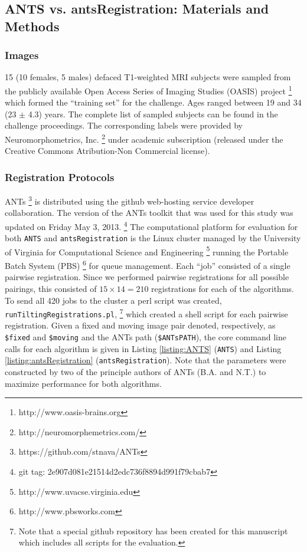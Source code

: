 \documentclass[final,5p,times,twocolumn]{elsarticle}
\begin{document}
\subsection{ANTS vs. antsRegistration:  Materials and Methods}

\subsubsection{Images}
15 (10 females, 5 males) defaced T1-weighted MRI subjects 
were sampled from the 
publicly available 
Open Access Series of Imaging Studies (OASIS) 
project%
\footnote{
  http://www.oasis-brains.org
} 
which formed the ``training set'' for the challenge.  
Ages ranged between 19 and 34 (23 $\pm$ 4.3) years.
The complete
list of sampled subjects can be found in the challenge proceedings.
The corresponding labels
were provided by Neuromorphometrics, Inc.%
\footnote{
http://neuromorphemetrics.com/
} under academic subscription (released under the Creative Commons 
Atribution-Non Commercial license).

\subsubsection{Registration Protocols}
ANTs%
\footnote{
https://github.com/stnava/ANTs
}
is distributed using the github web-hosting service
 developer collaboration.  The version
of the ANTs toolkit that was used for this study 
was updated on Friday May 3, 2013.%
\footnote{
git tag: 2e907d081e21514d2edc736f8894d991f79cbab7 
}   
The computational platform for evaluation for both 
\verb#ANTS# and \verb#antsRegistration# is the Linux 
cluster managed by the University of Virginia for 
Computational Science and Engineering%
\footnote{
http://www.uvacse.virginia.edu
}
running the Portable Batch System (PBS)%
\footnote{
http://www.pbsworks.com
}
for queue management.  Each ``job'' consisted of a single
pairwise registration.  Since we performed pairwise registrations
for all possible pairings, this consisted of $15\times14=210$
registrations for each of the algorithms.  To send all 420 
jobs to the cluster
a perl script was created, \verb#runTiltingRegistrations.pl#,%
\footnote{
Note that a special github repository has been created for this
manuscript which includes all scripts for the evaluation.
}
which created a shell script for each pairwise registration.
Given a fixed and moving image pair denoted, respectively, as
\verb#$fixed# and \verb#$moving# and the ANTs path (\verb#$ANTsPATH#), 
the core command line calls
for each algorithm is given in Listing \ref{listing:ANTS} 
(\verb#ANTS#) and Listing \ref{listing:antsRegistration}
(\verb#antsRegistration#).  Note that the parameters were
constructed by two of the principle authors of ANTs 
(B.A. and N.T.) to maximize performance for both algorithms.
\end{document}
